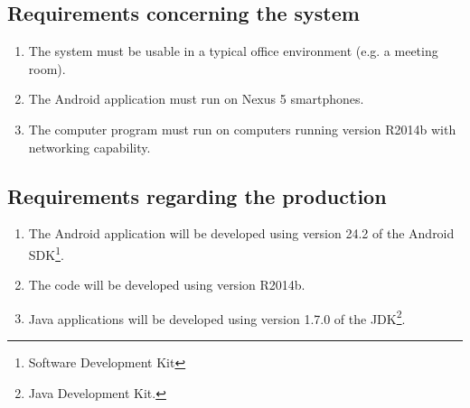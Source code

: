 \documentclass[a4paper, notitlepage]{report}
\begin{document}
\subsection{Requirements concerning the system}
\begin{enumerate}
\item The system must be usable in a typical office environment (e.g. a meeting room).
\item The Android application must run on Nexus 5 smartphones.
\item The computer program must run on computers running \matlab version R2014b with networking capability.
\end{enumerate}

\subsection{Requirements regarding the production}
\begin{enumerate}
\item The Android application will be developed using version 24.2 of the Android SDK\footnote{Software Development Kit}.
\item The \matlab code will be developed using \matlab version R2014b.
\item Java applications will be developed using version 1.7.0 of the JDK\footnote{Java Development Kit.}.
\end{enumerate}
\end{document}
